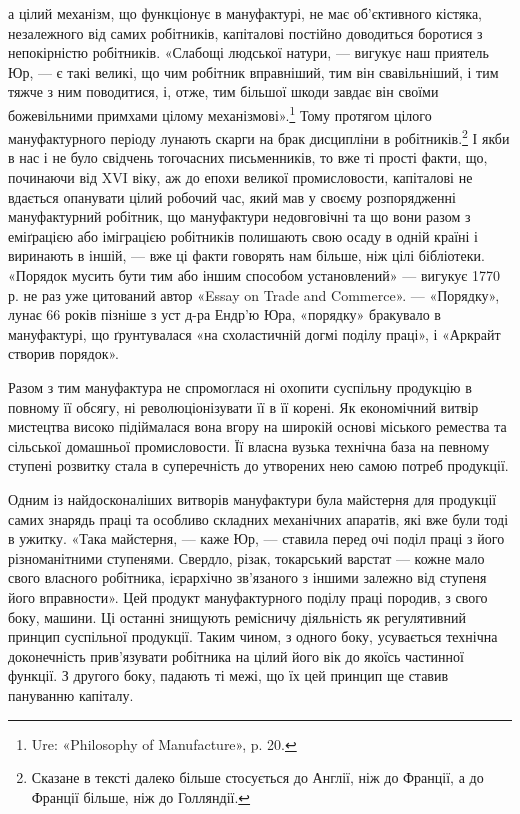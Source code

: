 \parcont{}  %
а цілий механізм, що функціонує в мануфактурі, не має об’єктивного
кістяка, незалежного від самих робітників, капіталові
постійно доводиться боротися з непокірністю робітників. «Слабощі
людської натури, — вигукує наш приятель Юр, — є такі великі,
що чим робітник вправніший, тим він свавільніший, і тим тяжче
з ним поводитися, і, отже, тим більшої шкоди завдає він своїми
божевільними примхами цілому механізмові».\footnote{
Ure: «Philosophy of Manufacture», p. 20.
} Тому протягом
цілого мануфактурного періоду лунають скарги на брак дисципліни
в робітників.\footnote{
Сказане в тексті далеко більше стосується до Англії, ніж до Франції,
а до Франції більше, ніж до Голляндії.
} І якби в нас і не було свідчень тогочасних
письменників, то вже ті прості факти, що, починаючи від XVI віку,
аж до епохи великої промисловости, капіталові не вдається опанувати
цілий робочий час, який мав у своєму розпорядженні
мануфактурний робітник, що мануфактури недовговічні та що
вони разом з еміґрацією або іміграцією робітників полишають
свою осаду в одній країні і виринають в іншій, — вже ці факти
говорять нам більше, ніж цілі бібліотеки. «Порядок мусить бути
тим або іншим способом установлений» — вигукує 1770 р. не раз
уже цитований автор «Essay on Trade and Commerce». — «Порядку»,
лунає 66 років пізніше з уст д-ра Ендр’ю Юра, «порядку»
бракувало в мануфактурі, що ґрунтувалася «на схоластичній
догмі поділу праці», і «Аркрайт створив порядок».

Разом з тим мануфактура не спромоглася ні охопити суспільну
продукцію в повному її обсягу, ні революціонізувати її в
її корені. Як економічний витвір мистецтва високо підіймалася
вона вгору на широкій основі міського ремества та сільської домашньої
промисловости. Її власна вузька технічна база на певному
ступені розвитку стала в суперечність до утворених нею самою
потреб продукції.

Одним із найдосконаліших витворів мануфактури була майстерня
для продукції самих знарядь праці та особливо складних
механічних апаратів, які вже були тоді в ужитку. «Така майстерня,
— каже Юр, — ставила перед очі поділ праці з його різноманітними
ступенями. Свердло, різак, токарський варстат —
кожне мало свого власного робітника, ієрархічно зв’язаного з
іншими залежно від ступеня його вправности». Цей продукт
мануфактурного поділу праці породив, з свого боку, машини.
Ці останні знищують ремісничу діяльність як регулятивний
принцип суспільної продукції. Таким чином, з одного боку,
усувається технічна доконечність прив’язувати робітника на
цілий його вік до якоїсь частинної функції. З другого боку,
падають ті межі, що їх цей принцип ще ставив пануванню
капіталу.
